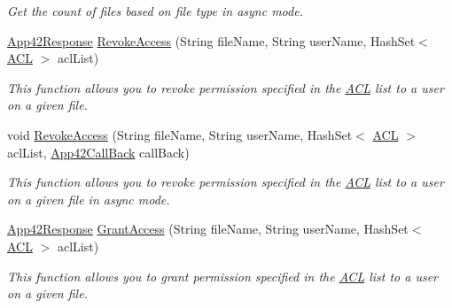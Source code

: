 \begin{DoxyCompactItemize}
\begin{DoxyCompactList}\small\item\em Get the count of files based on file type in async mode. \end{DoxyCompactList}\item 
\hyperlink{classcom_1_1shephertz_1_1app42_1_1paas_1_1sdk_1_1csharp_1_1_app42_response}{App42\+Response} \hyperlink{classcom_1_1shephertz_1_1app42_1_1paas_1_1sdk_1_1csharp_1_1upload_1_1_upload_service_afeb191684a25210ef232c52accae34cb}{Revoke\+Access} (String file\+Name, String user\+Name, Hash\+Set$<$ \hyperlink{classcom_1_1shephertz_1_1app42_1_1paas_1_1sdk_1_1csharp_1_1_a_c_l}{A\+C\+L} $>$ acl\+List)
\begin{DoxyCompactList}\small\item\em This function allows you to revoke permission specified in the \hyperlink{classcom_1_1shephertz_1_1app42_1_1paas_1_1sdk_1_1csharp_1_1_a_c_l}{A\+C\+L} list to a user on a given file. \end{DoxyCompactList}\item 
void \hyperlink{classcom_1_1shephertz_1_1app42_1_1paas_1_1sdk_1_1csharp_1_1upload_1_1_upload_service_a6ec88f82eccff0561acced0d6086a436}{Revoke\+Access} (String file\+Name, String user\+Name, Hash\+Set$<$ \hyperlink{classcom_1_1shephertz_1_1app42_1_1paas_1_1sdk_1_1csharp_1_1_a_c_l}{A\+C\+L} $>$ acl\+List, \hyperlink{interfacecom_1_1shephertz_1_1app42_1_1paas_1_1sdk_1_1csharp_1_1_app42_call_back}{App42\+Call\+Back} call\+Back)
\begin{DoxyCompactList}\small\item\em This function allows you to revoke permission specified in the \hyperlink{classcom_1_1shephertz_1_1app42_1_1paas_1_1sdk_1_1csharp_1_1_a_c_l}{A\+C\+L} list to a user on a given file in async mode. \end{DoxyCompactList}\item 
\hyperlink{classcom_1_1shephertz_1_1app42_1_1paas_1_1sdk_1_1csharp_1_1_app42_response}{App42\+Response} \hyperlink{classcom_1_1shephertz_1_1app42_1_1paas_1_1sdk_1_1csharp_1_1upload_1_1_upload_service_a07fdc815c5bf3571393bdf1e42fa2f97}{Grant\+Access} (String file\+Name, String user\+Name, Hash\+Set$<$ \hyperlink{classcom_1_1shephertz_1_1app42_1_1paas_1_1sdk_1_1csharp_1_1_a_c_l}{A\+C\+L} $>$ acl\+List)
\begin{DoxyCompactList}\small\item\em This function allows you to grant permission specified in the \hyperlink{classcom_1_1shephertz_1_1app42_1_1paas_1_1sdk_1_1csharp_1_1_a_c_l}{A\+C\+L} list to a user on a given file. \end{DoxyCompactList}\item 

\end{DoxyCompactItemize}
